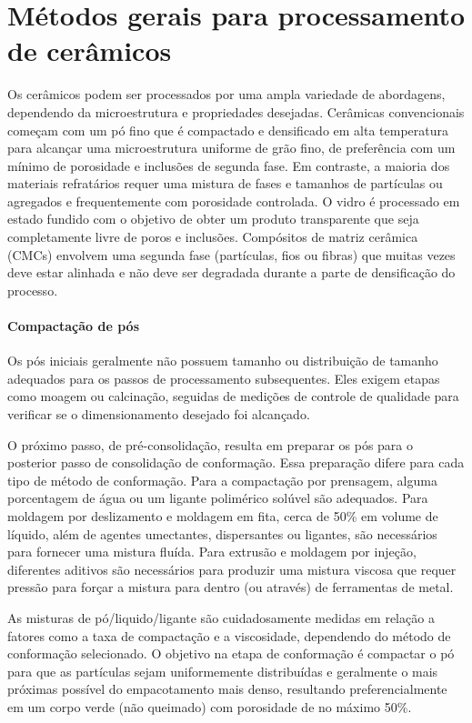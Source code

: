 
\section*{Métodos gerais para processamento de cerâmicos}
Os cerâmicos podem ser processados por uma ampla variedade de abordagens, dependendo da microestrutura e propriedades desejadas. Cerâmicas convencionais começam com um pó fino que é compactado e densificado em alta temperatura para alcançar uma microestrutura uniforme de grão fino, de preferência com um mínimo de porosidade e inclusões de segunda fase. Em contraste, a maioria dos materiais refratários requer uma mistura de fases e tamanhos de partículas ou agregados e frequentemente com porosidade controlada. O vidro é processado em estado fundido com o objetivo de obter um produto transparente que seja completamente livre de poros e inclusões. Compósitos de matriz cerâmica (CMCs) envolvem uma segunda fase (partículas, fios ou fibras) que muitas vezes deve estar alinhada e não deve ser degradada durante a parte de densificação do processo.

\paragraph{Compactação de pós}

Os pós iniciais geralmente não possuem tamanho ou distribuição de tamanho adequados para os passos de processamento subsequentes. Eles exigem etapas como moagem ou calcinação, seguidas de medições de controle de qualidade para verificar se o dimensionamento desejado foi alcançado.

O próximo passo, de pré-consolidação, resulta em preparar os pós para o posterior passo de consolidação de conformação. Essa preparação difere para cada tipo de método de conformação. Para a compactação por prensagem, alguma porcentagem de água ou um ligante polimérico solúvel são adequados. Para moldagem por deslizamento e moldagem em fita, cerca de 50\% em volume de líquido, além de agentes umectantes, dispersantes ou ligantes, são necessários para fornecer uma mistura fluída. Para extrusão e moldagem por injeção, diferentes aditivos são necessários para produzir uma mistura viscosa que requer pressão para forçar a mistura para dentro (ou através) de ferramentas de metal.

As misturas de pó/liquido/ligante são cuidadosamente medidas em relação a fatores como a taxa de compactação e a viscosidade, dependendo do método de conformação selecionado. O objetivo na etapa de conformação é compactar o pó para que as partículas sejam uniformemente distribuídas e geralmente o mais próximas possível do empacotamento mais denso, resultando preferencialmente em um corpo verde (não queimado) com porosidade de no máximo 50\%.

